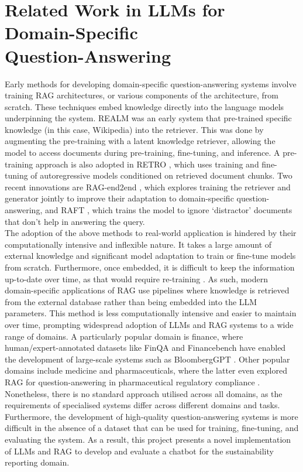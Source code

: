 \section{Related Work in LLMs for Domain-Specific \\Question-Answering}
Early methods for developing domain-specific question-answering systems involve training RAG architectures, or various components of the architecture, from scratch. These techniques embed knowledge directly into the language models underpinning the system. REALM \cite{guu2020realm} was an early system that pre-trained specific knowledge (in this case, Wikipedia) into the retriever. This was done by augmenting the pre-training with a latent knowledge retriever, allowing the model to access documents during pre-training, fine-tuning, and inference. A pre-training approach is also adopted in RETRO \cite{borgeaud2022improvinglanguagemodelsretrieving}, which uses training and fine-tuning of autoregressive models conditioned on retrieved document chunks. Two recent innovations are RAG-end2end \cite{siriwardhana2022improvingdomainadaptationretrieval}, which explores training the retriever and generator jointly to improve their adaptation to domain-specific question-answering, and RAFT \cite{zhang2024raftadaptinglanguagemodel}, which trains the model to ignore `distractor' documents that don't help in answering the query. \\


The adoption of the above methods to real-world application is hindered by their computationally intensive and inflexible nature. It takes a large amount of external knowledge and significant model adaptation to train or fine-tune models from scratch. Furthermore, once embedded, it is difficult to keep the information up-to-date over time, as that would require re-training \cite{gao2024retrievalaugmented}. As such, modern domain-specific applications of RAG use pipelines where knowledge is retrieved from the external database rather than being embedded into the LLM parameters. This method is less computationally intensive and easier to maintain over time, prompting widespread adoption of LLMs and RAG systems to a wide range of domains. A particularly popular domain is finance, where human/expert-annotated datasets like FinQA \cite{chen2022finqa} and Financebench \cite{islam2023financebench} have enabled the development of large-scale systems such as BloombergGPT \cite{wu2023bloomberggptlargelanguagemodel}. Other popular domains include medicine \cite{xiong2024benchmarkingretrievalaugmentedgenerationmedicine} and pharmaceuticals, where the latter even explored RAG for question-answering in pharmaceutical regulatory compliance \cite{kim2024ragqaragintegratinggenerative}. \\


Nonetheless, there is no standard approach utilised across all domains, as the requirements of specialised systems differ across different domains and tasks. Furthermore, the development of high-quality question-answering systems is more difficult in the absence of a dataset that can be used for training, fine-tuning, and evaluating the system. As a result, this project presents a novel implementation of LLMs and RAG to develop and evaluate a chatbot for the sustainability reporting domain.